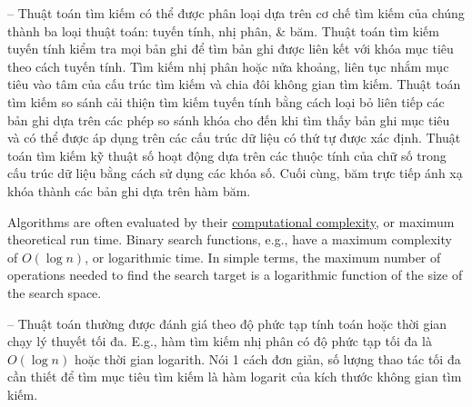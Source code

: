 \documentclass[oneside]{book}
\begin{document}
-- Thuật toán tìm kiếm có thể được phân loại dựa trên cơ chế tìm kiếm của chúng thành ba loại thuật toán: tuyến tính, nhị phân, \& băm. Thuật toán tìm kiếm tuyến tính kiểm tra mọi bản ghi để tìm bản ghi được liên kết với khóa mục tiêu theo cách tuyến tính. Tìm kiếm nhị phân hoặc nửa khoảng, liên tục nhắm mục tiêu vào tâm của cấu trúc tìm kiếm và chia đôi không gian tìm kiếm. Thuật toán tìm kiếm so sánh cải thiện tìm kiếm tuyến tính bằng cách loại bỏ liên tiếp các bản ghi dựa trên các phép so sánh khóa cho đến khi tìm thấy bản ghi mục tiêu và có thể được áp dụng trên các cấu trúc dữ liệu có thứ tự được xác định. Thuật toán tìm kiếm kỹ thuật số hoạt động dựa trên các thuộc tính của chữ số trong cấu trúc dữ liệu bằng cách sử dụng các khóa số. Cuối cùng, băm trực tiếp ánh xạ khóa thành các bản ghi dựa trên hàm băm.

Algorithms are often evaluated by their \href{https://en.wikipedia.org/wiki/Computational_complexity}{computational complexity}, or maximum theoretical run time. Binary search functions, e.g., have a maximum complexity of $O(\log n)$, or logarithmic time. In simple terms, the maximum number of operations needed to find the search target is a logarithmic function of the size of the search space.

-- Thuật toán thường được đánh giá theo độ phức tạp tính toán hoặc thời gian chạy lý thuyết tối đa. E.g., hàm tìm kiếm nhị phân có độ phức tạp tối đa là $O(\log n)$ hoặc thời gian logarith. Nói 1 cách đơn giản, số lượng thao tác tối đa cần thiết để tìm mục tiêu tìm kiếm là hàm logarit của kích thước không gian tìm kiếm.

\end{document}
